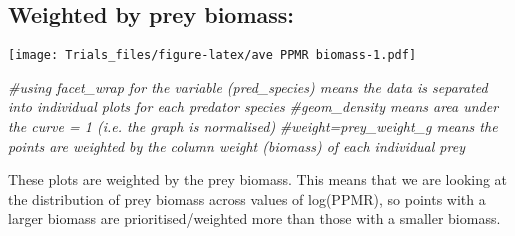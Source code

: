 \documentclass[
]{article}
\newenvironment{Shaded}{\begin{snugshade}}{\end{snugshade}}
\newcommand{\AttributeTok}[1]{\textcolor[rgb]{0.77,0.63,0.00}{#1}}
\newcommand{\CommentTok}[1]{\textcolor[rgb]{0.56,0.35,0.01}{\textit{#1}}}
\newcommand{\DecValTok}[1]{\textcolor[rgb]{0.00,0.00,0.81}{#1}}
\newcommand{\FunctionTok}[1]{\textcolor[rgb]{0.00,0.00,0.00}{#1}}
\newcommand{\NormalTok}[1]{#1}
\newcommand{\SpecialCharTok}[1]{\textcolor[rgb]{0.00,0.00,0.00}{#1}}
\newcommand{\StringTok}[1]{\textcolor[rgb]{0.31,0.60,0.02}{#1}}
\begin{document}
\hypertarget{weighted-by-prey-biomass}{%
\subsection{Weighted by prey biomass:}\label{weighted-by-prey-biomass}}

\begin{Shaded}
\end{Shaded}

\texttt{[image: Trials\_files/figure-latex/ave PPMR biomass-1.pdf]}

\begin{Shaded}
\begin{Highlighting}[]
\CommentTok{\#using facet\_wrap for the variable (pred\_species) means the data is separated into individual plots for each predator species}
\CommentTok{\#geom\_density means area under the curve = 1 (i.e. the graph is normalised)}
\CommentTok{\#weight=prey\_weight\_g means the points are \textquotesingle{}weighted\textquotesingle{} by the column weight (biomass) of each individual prey}
\end{Highlighting}
\end{Shaded}

These plots are weighted by the prey biomass. This means that we are
looking at the distribution of prey biomass across values of log(PPMR),
so points with a larger biomass are prioritised/weighted more than those
with a smaller biomass.
\end{document}
